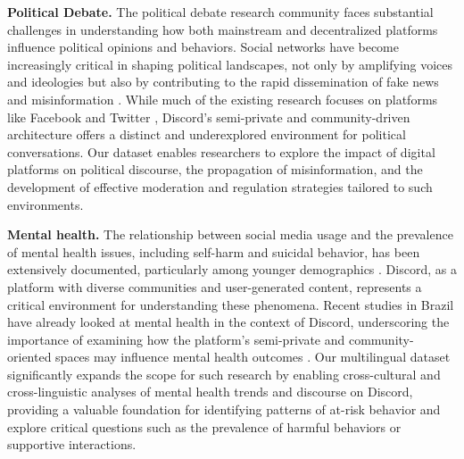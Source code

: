 \textbf{Political Debate.} The political debate research community faces substantial challenges in understanding how both mainstream and decentralized platforms influence political opinions and behaviors. Social networks have become increasingly critical in shaping political landscapes, not only by amplifying voices and ideologies but also by contributing to the rapid dissemination of fake news and misinformation \cite{Aimeur2023}. While much of the existing research focuses on platforms like Facebook and Twitter \cite{10.1145/3578503.3583597, doi:10.1126/science.adk3451}, Discord’s semi-private and community-driven architecture offers a distinct and underexplored environment for political conversations. 
Our dataset enables researchers to explore the impact of digital platforms on political discourse, the propagation of misinformation, and the development of effective moderation and regulation strategies tailored to such environments.

\textbf{Mental health.} The relationship between social media usage and the prevalence of mental health issues, including self-harm and suicidal behavior, has been extensively documented, particularly among younger demographics \cite{elia2020, pater2016characterizations}. Discord, as a platform with diverse communities and user-generated content, represents a critical environment for understanding these phenomena. Recent studies in Brazil have already looked at mental health in the context of Discord, underscoring the importance of examining how the platform’s semi-private and community-oriented spaces may influence mental health outcomes \cite{webmedia}. Our multilingual dataset significantly expands the scope for such research by enabling cross-cultural and cross-linguistic analyses of mental health trends and discourse on Discord, providing a valuable foundation for identifying patterns of at-risk behavior and explore critical questions such as the prevalence of harmful behaviors or supportive interactions.


